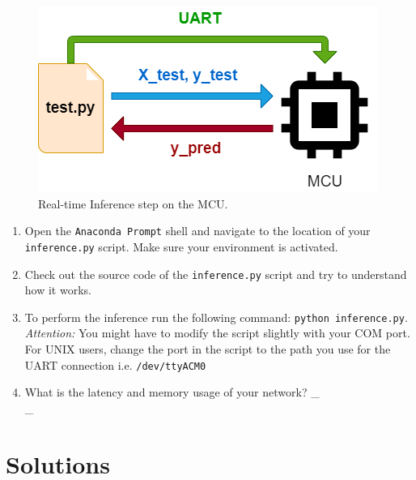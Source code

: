 \documentclass[parskip=half,notes,cadrem,toolver]{iisvlsi}
\begin{document}
\begin{figure}[H]
    \begin{center}
        \includegraphics[width=0.7\linewidth]{figures/inference (1).png}
        \caption[Real-time Inference step on the MCU.]{Real-time Inference step on the MCU.}
        \label{fig:inference}
    \end{center}
\end{figure}

\begin{studtask}
    \label{task:inference}
    \begin{enumerate}
    \item Open the \texttt{Anaconda Prompt} shell and navigate to the location of your \texttt{inference.py} script. Make sure your environment is activated. 
    \item Check out the source code of the \texttt{inference.py} script and try to understand how it works. 
    \item To perform the inference run the following command: \texttt{python inference.py}.
    \textit{Attention:} You might have to modify the script slightly with your COM port.
    \\For UNIX users, change the port in the script to the path you use for the UART connection i.e. \texttt{/dev/ttyACM0}
    \item What is the latency and memory usage of your network? 
    \_\answerrule \\
    \_\answerrule \\
    \end{enumerate}
\end{studtask}




\section{Solutions}
\end{document}

